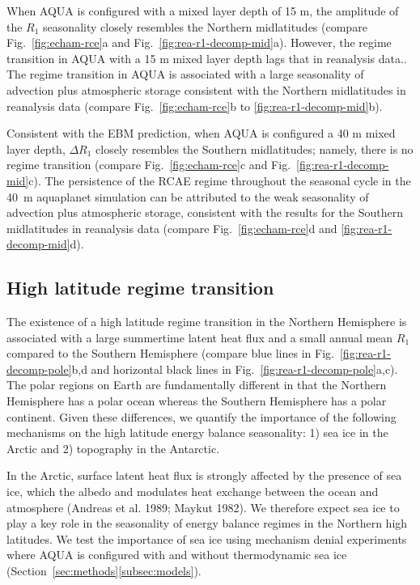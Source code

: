 \documentclass{ametsocV5}
\begin{document}
  When AQUA is configured with a mixed layer depth of 15 m, the amplitude of the \(R_{1}\) seasonality closely resembles the Northern midlatitudes (compare Fig.~\ref{fig:echam-rce}a and Fig.~\ref{fig:rea-r1-decomp-mid}a). However, the regime transition in AQUA with a 15 m mixed layer depth lags that in reanalysis data.. The regime transition in AQUA is associated with a large seasonality of advection plus atmospheric storage consistent with the Northern midlatitudes in reanalysis data (compare Fig.~\ref{fig:echam-rce}b to \ref{fig:rea-r1-decomp-mid}b). 
  
  Consistent with the EBM prediction, when AQUA is configured a 40 m mixed layer depth, \(\Delta R_{1}\) closely resembles the Southern midlatitudes; namely, there is no regime transition (compare Fig.~\ref{fig:echam-rce}c and Fig.~\ref{fig:rea-r1-decomp-mid}c). The persistence of the RCAE regime throughout the seasonal cycle in the 40~m aquaplanet simulation can be attributed to the weak seasonality of advection plus atmospheric storage, consistent with the results for the Southern midlatitudes in reanalysis data (compare Fig.~\ref{fig:echam-rce}d and \ref{fig:rea-r1-decomp-mid}d).

  \subsection{High latitude regime transition} \label{subsec:ice}
  The existence of a high latitude regime transition in the Northern Hemisphere is associated with a large summertime latent heat flux and a small annual mean $R_1$ compared to the Southern Hemisphere (compare blue lines in Fig.~\ref{fig:rea-r1-decomp-pole}b,d and horizontal black lines in Fig.~\ref{fig:rea-r1-decomp-pole}a,c). The polar regions on Earth are fundamentally different in that the Northern Hemisphere has a polar ocean whereas the Southern Hemisphere has a polar continent. Given these differences, we quantify the importance of the following mechanisms on the high latitude energy balance seasonality: 1) sea ice in the Arctic and 2) topography in the Antarctic.
  
  In the Arctic, surface latent heat flux is strongly affected by the presence of sea ice, which  the albedo and modulates heat exchange between the ocean and atmosphere (Andreas et al. 1989; Maykut 1982). We therefore expect sea ice to play a key role in the seasonality of energy balance regimes in the Northern high latitudes. We test the importance of sea ice using mechanism denial experiments where AQUA is configured with and without thermodynamic sea ice (Section~\ref{sec:methods}\ref{subsec:models}).
\end{document}
